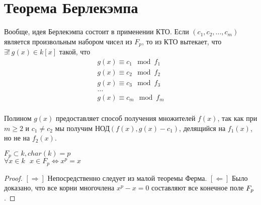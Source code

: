 \section{Теорема Берлекэмпа}

Вообще, идея Берлекэмпа состоит в применении КТО. Если $(c_1, c_2, ..., c_m)$ является произвольным набором чисел из $F_p$, то из КТО вытекает, что $\exists!~g(x) \in k[x]$
такой, что 
\[
\begin{array}{l}
g(x) \equiv c_1 \mod f_1 \\
g(x) \equiv c_2 \mod f_2 \\
g(x) \equiv c_3 \mod f_3 \\
\dots \\
g(x) \equiv c_m \mod f_m \\
\end{array}
\]

Полином $g(x)$ предоставляет способ получения множителей $f(x)$, так как при $m \geqslant 2$ и $c_1 \neq c_2$ мы получим
$\text{НОД}(f(x), g(x) - c_1)$, делящийся на $f_1(x)$, но не на $f_2(x)$.

\begin{lem}
$F_p \subset k, char(k) = p$ \\
$\forall x \in k~~~x \in F_p \Leftrightarrow x^p = x $
\end{lem}
\begin{proof}
  $ [\Rightarrow] $ Непосредственно следует из малой теоремы Ферма. \newline
  $ [\Leftarrow] $ Было доказано, что все корни многочлена $ x^p - x = 0 $ составляют все конечное поле $ F_{p} $.
\end{proof}


